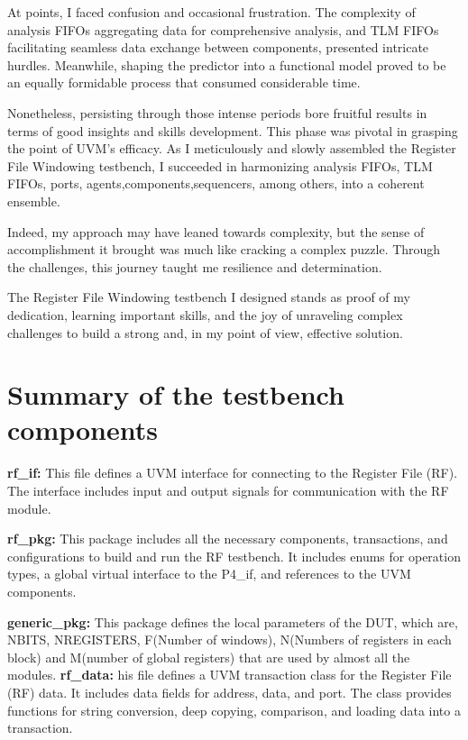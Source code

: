 \documentclass[12pt,a4paper]{report}
\begin{document}
At points, I faced confusion and occasional frustration. The complexity of analysis FIFOs aggregating data for comprehensive analysis, and TLM FIFOs facilitating seamless data exchange between components, presented intricate hurdles. Meanwhile, shaping the predictor into a functional model proved to be an equally formidable process that consumed considerable time.

Nonetheless, persisting through those intense periods bore fruitful results in terms of good insights and skills development. This phase was pivotal in grasping the point of UVM's efficacy. As I meticulously and slowly assembled the Register File Windowing testbench, I succeeded in harmonizing analysis FIFOs, TLM FIFOs, ports, agents,components,sequencers, among others, into a coherent ensemble.

Indeed, my approach may have leaned towards complexity, but the sense of accomplishment it brought was much like cracking a complex puzzle. Through the challenges, this journey taught me resilience and determination.

The Register File Windowing testbench I designed stands as proof of my dedication, learning important skills, and the joy of unraveling complex challenges to build a strong and, in my point of view, effective solution.


\section{Summary of the testbench components}
\vspace*{0.3cm}
\textbf{rf\_if:} This file defines a UVM interface for connecting to the Register File (RF). The interface includes input and output signals for communication with the RF module.

\vspace*{0.3cm}

\textbf{rf\_pkg:} This package includes all the necessary components, transactions, and configurations to build and run the RF testbench. It includes enums for operation types, a global virtual interface to the P4\_if, and references to the UVM components.

\vspace*{0.3cm}
\textbf{generic\_pkg:} This package defines the local parameters of the DUT, which are, NBITS, NREGISTERS, F(Number of windows), N(Numbers of registers in each block) and M(number of global registers) that are used by almost all the modules.
\vspace*{0.3cm}
\textbf{rf\_data:} his file defines a UVM transaction class for the Register File (RF) data. It includes data fields for address, data, and port. The class provides functions for string conversion, deep copying, comparison, and loading data into a transaction.
\end{document}
